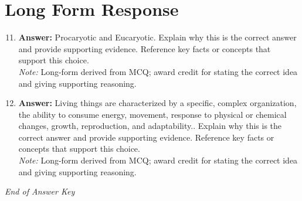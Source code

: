 \documentclass[12pt]{article}
\begin{document}
\section*{Long Form Response}
\begin{enumerate}[label=\arabic*.]
\setcounter{enumi}{10}
\item \textbf{Answer:} Procaryotic and Eucaryotic. Explain why this is the correct answer and provide supporting evidence. Reference key facts or concepts that support this choice.
\\ \textit{Note:} Long-form derived from MCQ; award credit for stating the correct idea and giving supporting reasoning.
\item \textbf{Answer:} Living things are characterized by a specific, complex organization, the ability to consume energy, movement, response to physical or chemical changes, growth, reproduction, and adaptability.. Explain why this is the correct answer and provide supporting evidence. Reference key facts or concepts that support this choice.
\\ \textit{Note:} Long-form derived from MCQ; award credit for stating the correct idea and giving supporting reasoning.
\end{enumerate}

\vfill
\noindent\textit{End of Answer Key}
\end{document}
